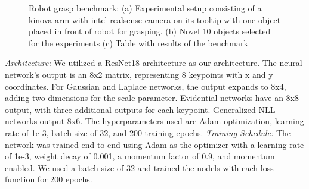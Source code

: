 \documentclass[letterpaper, 10 pt, conference]{ieeeconf}  %
\begin{document}
\begin{figure}[t]
    \centering
    \qquad
     \centering
    \qquad
    \caption{Robot grasp benchmark: (a) Experimental setup consisting of a kinova arm with intel realsense camera on its tooltip with one object placed in front of robot for grasping. (b) Novel 10 objects selected for the experiments (c) Table with results of the benchmark }
\end{figure}
\textit{Architecture:} 
We utilized a ResNet18 architecture \cite{he2016deep} as our architecture. The neural network's output is an 8x2 matrix, representing 8 keypoints with x and y coordinates. For Gaussian and Laplace networks, the output expands to 8x4, adding two dimensions for the scale parameter. Evidential networks have an 8x8 output, with three additional outputs for each keypoint. Generalized NLL networks output 8x6.  The hyperparameters used are Adam optimization, learning rate of 1e-3, batch size of 32, and 200 training epochs. 
\textit{Training Schedule:}
The network was trained end-to-end using Adam as the optimizer with a learning rate of 1e-3, weight decay of 0.001, a momentum factor of 0.9, and momentum enabled. We used a batch size of 32 and trained the nodels with each loss function for 200 epochs.
\end{document}
